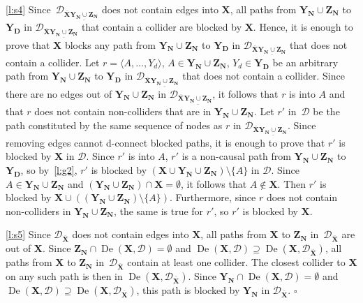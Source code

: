 \documentclass[11pt,a4paper]{article}
\newenvironment{proofof}[1][]{\begin{trivlist}
   \item[\hskip \labelsep {\bfseries Proof of #1.}]}{\hfill{}$\square$\end{trivlist}}
\DeclareMathOperator{\De}{De}
\newcommand{\g}[1][G]{\mathcal{#1}}
\begin{document}
\begin{proofof}[Lemma~\ref{lemma:shpitser ynyd}]
\ref{l:s4} Since~$\g[D]_{\overline{\mathbf{X}}\underline{\mathbf{Y_N} \cup  \mathbf{Z_N}}}$ does not contain edges into $\mathbf{X}$, all paths from $\mathbf{Y_N} \cup  \mathbf{Z_N}$ to $\mathbf{Y_D}$ in $\g[D]_{\overline{\mathbf{X}}\underline{\mathbf{Y_N} \cup  \mathbf{Z_N}}}$ that contain a collider are blocked by $\mathbf{X}$. Hence, it is enough to prove that $\mathbf{X}$ blocks any path from $\mathbf{Y_N} \cup  \mathbf{Z_N}$ to $\mathbf{Y_D}$ in $\g[D]_{\overline{\mathbf{X}}\underline{\mathbf{Y_N} \cup  \mathbf{Z_N}}}$ that does not contain a collider. Let $r = \langle A, \dots , Y_d \rangle$, $A \in \mathbf{Y_N} \cup  \mathbf{Z_N}$, $Y_d \in \mathbf{Y_D}$ be an arbitrary path from $\mathbf{Y_N} \cup  \mathbf{Z_N}$ to $\mathbf{Y_D}$ in $\g[D]_{\overline{\mathbf{X}}\underline{\mathbf{Y_N} \cup  \mathbf{Z_N}}}$ that does not contain a collider. Since there are no edges out of $\mathbf{Y_N} \cup  \mathbf{Z_N}$ in $\g[D]_{\overline{\mathbf{X}}\underline{\mathbf{Y_N} \cup  \mathbf{Z_N}}}$, it follows that $r$ is into $A$ and that $r$ does not contain non-colliders that are in $\mathbf{Y_N} \cup  \mathbf{Z_N}$.
Let $r'$ in~$\g[D]$ be the path constituted by the same sequence of nodes as $r$ in $\g[D]_{\overline{\mathbf{X}}\underline{\mathbf{Y_N} \cup  \mathbf{Z_N}}}$. Since removing edges cannot d-connect blocked paths, it is enough to prove that $r'$ is blocked by $\mathbf{X}$ in $\g[D]$.
Since $r'$ is into $A$, $r'$ is a non-causal path from $\mathbf{Y_N} \cup  \mathbf{Z_N}$ to $\mathbf{Y_D}$, so by~\ref{l:g2}, $r'$ is blocked by $(\mathbf{X} \cup \mathbf{Y_N} \cup \mathbf{Z_N}) \setminus \{A\}$ in $\g[D]$. Since $A \in \mathbf{Y_N} \cup  \mathbf{Z_N}$ and $(\mathbf{Y_N} \cup  \mathbf{Z_N}) \cap \mathbf{X}=\emptyset$, it follows that $A \notin \mathbf{X}$. Then $r'$ is blocked by $\mathbf{X} \cup ((\mathbf{Y_N} \cup \mathbf{Z_N}) \setminus\{A\})$. Furthermore, since $r$ does not contain non-colliders in $\mathbf{Y_N} \cup  \mathbf{Z_N}$, the same is true for $r'$, so $r'$ is blocked by $\mathbf{X}$.
 
\ref{l:s5} Since $\g[D]_{\overline{\mathbf{X}}}$ does not contain edges into $\mathbf{X}$, all paths from $\mathbf{X}$ to $\mathbf{Z_N}$ in~$\g[D]_{\overline{\mathbf{X}}}$ are out of $\mathbf{X}$.
Since $\mathbf{Z_N} \cap \De(\mathbf{X},\g[D]) = \emptyset$ and $\De(\mathbf{X},\g[D]) \supseteq \De(\mathbf{X},\g[D]_{\overline{\mathbf{X}}})$, all paths from $\mathbf{X}$ to $\mathbf{Z_N}$ in~$\g[D]_{\overline{\mathbf{X}}}$ contain at least one collider. The closest collider to $\mathbf{X}$ on any such path is then in $\De(\mathbf{X},\g[D]_{\overline{\mathbf{X}}})$. Since $\mathbf{Y_N} \cap \De(\mathbf{X},\g[D]) = \emptyset$ and $\De(\mathbf{X},\g[D]) \supseteq \De(\mathbf{X},\g[D]_{\overline{\mathbf{X}}})$, this path is blocked by $\mathbf{Y_N}$ in $\g[D]_{\overline{\mathbf{X}}}$.
\end{proofof}


\vskip 0.2in
%

\end{document}
